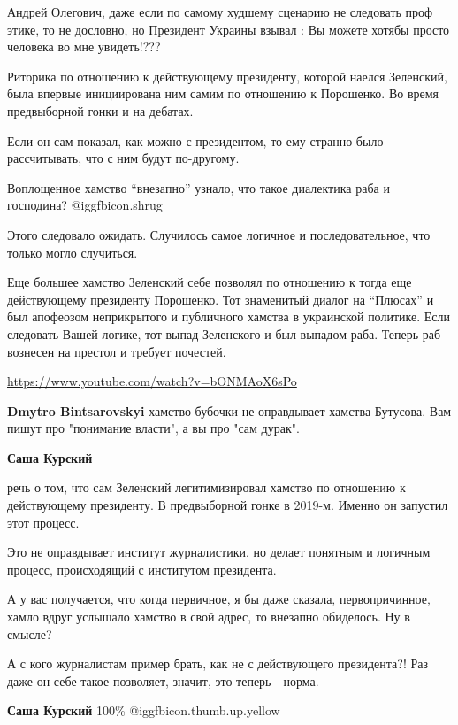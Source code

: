 \begin{itemize}
Андрей Олегович, даже если по самому худшему сценарию не следовать проф этике,
то не дословно, но Президент Украины взывал : Вы можете хотябы просто человека
во мне увидеть!???


Риторика по отношению к действующему президенту, которой наелся Зеленский, была
впервые инициирована ним самим по отношению к Порошенко. Во время предвыборной
гонки и на дебатах.

Если он сам показал, как можно с президентом, то ему странно было рассчитывать,
что с ним будут по-другому.

Воплощенное хамство \enquote{внезапно} узнало, что такое диалектика раба и господина?
 @igg{fbicon.shrug} 

Этого следовало ожидать. Случилось самое логичное и последовательное, что
только могло случиться.


Еще большее хамство Зеленский себе позволял по отношению к тогда еще
действующему президенту Порошенко. Тот знаменитый диалог на \enquote{Плюсах} и был
апофеозом неприкрытого и публичного хамства в украинской политике. Если
следовать Вашей логике, тот выпад Зеленского и был выпадом раба. Теперь раб
вознесен на престол и требует почестей.

\url{https://www.youtube.com/watch?v=bONMAoX6sPo}

\begin{itemize} %
\textbf{Dmytro Bintsarovskyi} хамство бубочки не оправдывает хамства Бутусова. Вам пишут про "понимание власти", а вы про "сам дурак".

\textbf{Саша Курский} 

речь о том, что сам Зеленский легитимизировал хамство по отношению к
действующему президенту. В предвыборной гонке в 2019-м. Именно он запустил этот
процесс.

Это не оправдывает институт журналистики, но делает понятным и логичным
процесс, происходящий с институтом президента.

А у вас получается, что когда первичное, я бы даже сказала, первопричинное,
хамло вдруг услышало хамство в свой адрес, то внезапно обиделось. Ну в смысле?

А с кого журналистам пример брать, как не с действующего президента?! Раз даже
он себе такое позволяет, значит, это теперь - норма.

\textbf{Саша Курский} 100\%  @igg{fbicon.thumb.up.yellow} 
\end{itemize} %


\end{itemize}

